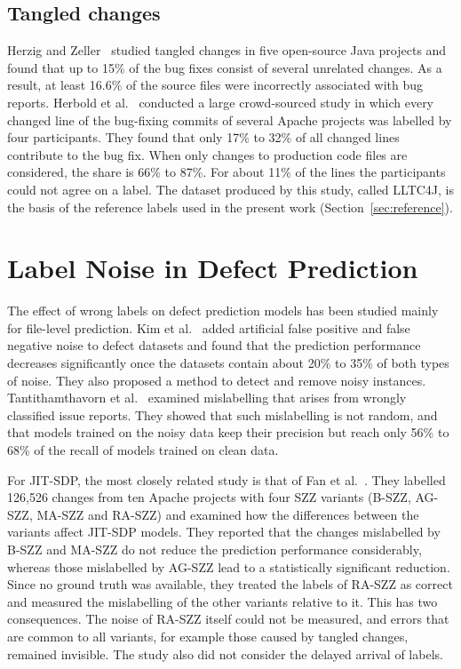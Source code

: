\documentclass[12pt,a4paper,oneside]{report}
\begin{document}
\subsection{Tangled changes}

Herzig and Zeller~\cite{herzig2013tangled} studied tangled changes in five
open-source Java projects and found that up to 15\% of the bug fixes consist
of several unrelated changes. As a result, at least 16.6\% of the source files
were incorrectly associated with bug reports. Herbold et
al.~\cite{herbold2022tangling} conducted a large crowd-sourced study in which
every changed line of the bug-fixing commits of several Apache projects was
labelled by four participants. They found that only 17\% to 32\% of all
changed lines contribute to the bug fix. When only changes to production code
files are considered, the share is 66\% to 87\%. For about 11\% of the lines
the participants could not agree on a label. The dataset produced by this
study, called LLTC4J, is the basis of the reference labels used in the present
work (Section~\ref{sec:reference}).

\section{Label Noise in Defect Prediction}

The effect of wrong labels on defect prediction models has been studied
mainly for file-level prediction. Kim et al.~\cite{kim2011noise} added
artificial false positive and false negative noise to defect datasets and
found that the prediction performance decreases significantly once the
datasets contain about 20\% to 35\% of both types of noise. They also proposed
a method to detect and remove noisy instances. Tantithamthavorn et
al.~\cite{tantithamthavorn2015mislabelling} examined mislabelling that arises
from wrongly classified issue reports. They showed that such mislabelling is
not random, and that models trained on the noisy data keep their precision
but reach only 56\% to 68\% of the recall of models trained on clean data.

For JIT-SDP, the most closely related study is that of Fan et
al.~\cite{fan2021mislabeled}. They labelled 126,526 changes from ten Apache
projects with four SZZ variants (B-SZZ, AG-SZZ, MA-SZZ and RA-SZZ) and
examined how the differences between the variants affect JIT-SDP models. They
reported that the changes mislabelled by B-SZZ and MA-SZZ do not reduce the
prediction performance considerably, whereas those mislabelled by AG-SZZ lead
to a statistically significant reduction. Since no ground truth was available,
they treated the labels of RA-SZZ as correct and measured the mislabelling of
the other variants relative to it. This has two consequences. The noise of
RA-SZZ itself could not be measured, and errors that are common to all
variants, for example those caused by tangled changes, remained invisible. The
study also did not consider the delayed arrival of labels.
\end{document}

